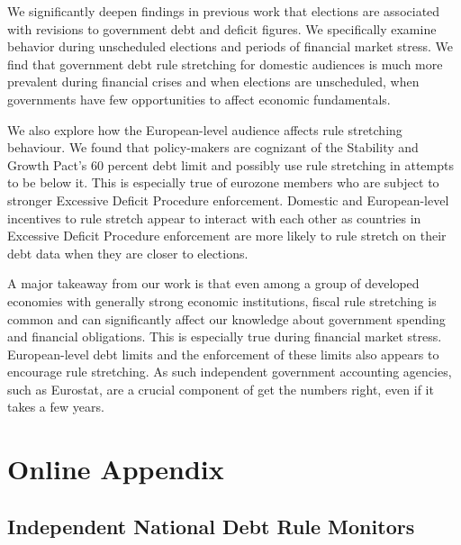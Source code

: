 \documentclass[]{article}
\begin{document}
We significantly deepen findings in previous work that elections are associated with revisions to government debt and deficit figures. We specifically examine behavior during unscheduled elections and periods of financial market stress. We find that government debt rule stretching for domestic audiences is much more prevalent during financial crises and when elections are unscheduled, when governments have few opportunities to affect economic fundamentals.

We also explore how the European-level audience affects rule stretching behaviour. We found that policy-makers are cognizant of the Stability and Growth Pact's 60 percent debt limit and possibly use rule stretching in attempts to be below it. This is especially true of eurozone members who are subject to stronger Excessive Deficit Procedure enforcement. Domestic and European-level incentives to rule stretch appear to interact with each other as countries in Excessive Deficit Procedure enforcement are more likely to rule stretch on their debt data when they are closer to elections.

A major takeaway from our work is that even among a group of developed economies with generally strong economic institutions, fiscal rule stretching is common and can significantly affect our knowledge about government spending and financial obligations. This is especially true during financial market stress. European-level debt limits and the enforcement of these limits also appears to encourage rule stretching. As such independent government accounting agencies, such as Eurostat, are a crucial component of get the numbers right, even if it takes a few years.


\clearpage




\pagebreak
\renewcommand{\thepage}{A-\arabic{page}}\setcounter{page}{1}
\renewcommand{\thesection}{Appendix \arabic{section}}\setcounter{section}{0}
\renewcommand{\thetable}{A-\arabic{table}}\setcounter{table}{0}
\renewcommand{\thefigure}{A-\arabic{figure}}\setcounter{figure}{0}
\clearpage

\section*{Online Appendix}

\subsection*{Independent National Debt Rule Monitors}
\end{document}
